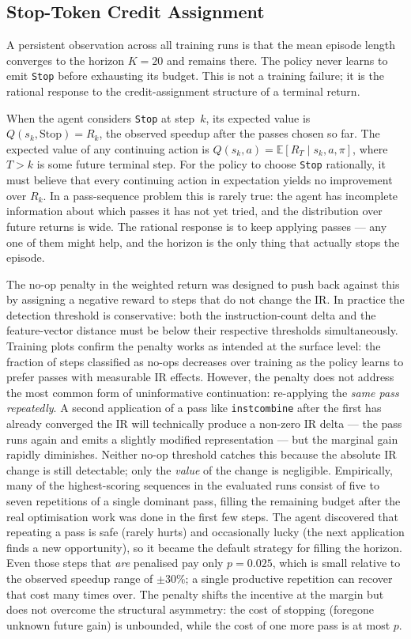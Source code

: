 \documentclass[conference]{IEEEtran}
\newcommand{\pass}[1]{\texttt{#1}}
\begin{document}
\subsection{Stop-Token Credit Assignment}
\label{sec:stop}
A persistent observation across all training runs is that the mean episode
length converges to the horizon $K = 20$ and remains there.
The policy never learns to emit \pass{Stop} before exhausting its budget.
This is not a training failure; it is the rational response to the
credit-assignment structure of a terminal return.

When the agent considers \pass{Stop} at step~$k$, its expected value is
$Q(s_k, \text{Stop}) = R_k$, the observed speedup after the passes chosen so
far.
The expected value of any continuing action is
$Q(s_k, a) = \mathbb{E}[R_T \mid s_k, a, \pi]$, where $T > k$ is some
future terminal step.
For the policy to choose \pass{Stop} rationally, it must believe that every
continuing action in expectation yields no improvement over $R_k$.
In a pass-sequence problem this is rarely true: the agent has incomplete
information about which passes it has not yet tried, and the distribution over
future returns is wide.
The rational response is to keep applying passes — any one of them might help,
and the horizon is the only thing that actually stops the episode.

The no-op penalty in the weighted return was designed to push back against
this by assigning a negative reward to steps that do not change the IR.
In practice the detection threshold is conservative: both the instruction-count
delta and the feature-vector distance must be below their respective thresholds
simultaneously.
Training plots confirm the penalty works as intended at the surface level:
the fraction of steps classified as no-ops decreases over training as the
policy learns to prefer passes with measurable IR effects.
However, the penalty does not address the most common form of uninformative
continuation: re-applying the \emph{same pass repeatedly}.
A second application of a pass like \pass{instcombine} after the first has
already converged the IR will technically produce a non-zero IR delta --- the
pass runs again and emits a slightly modified representation --- but the
marginal gain rapidly diminishes.
Neither no-op threshold catches this because the absolute IR change is still
detectable; only the \emph{value} of the change is negligible.
Empirically, many of the highest-scoring sequences in the evaluated runs
consist of five to seven repetitions of a single dominant pass, filling the
remaining budget after the real optimisation work was done in the first few
steps.
The agent discovered that repeating a pass is safe (rarely hurts) and
occasionally lucky (the next application finds a new opportunity), so it
became the default strategy for filling the horizon.
Even those steps that \emph{are} penalised pay only $p = 0.025$, which is
small relative to the observed speedup range of $\pm 30\%$; a single
productive repetition can recover that cost many times over.
The penalty shifts the incentive at the margin but does not overcome the
structural asymmetry: the cost of stopping (foregone unknown future gain) is
unbounded, while the cost of one more pass is at most $p$.
\end{document}
